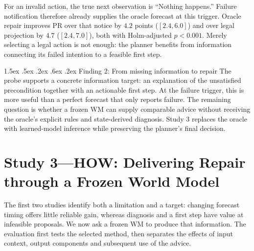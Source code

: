 \documentclass[runningheads]{llncs}
\makeatletter
\renewcommand\paragraph{\@startsection{paragraph}{4}{\z@}%
  {1.5ex \@plus .5ex \@minus .2ex}%
  {.6ex \@plus .2ex}%
  {\normalfont\normalsize\bfseries}}
\makeatother
\begin{document}
For an invalid action, the true next observation is ``Nothing happens.'' Failure notification therefore already supplies the oracle forecast at this trigger. Oracle repair improves PR over that notice by $4.2$ points ($[2.4,6.0]$) and over legal projection by $4.7$ ($[2.4,7.0]$), both with Holm-adjusted $p<0.001$. Merely selecting a legal action is not enough: the planner benefits from information connecting its failed intention to a feasible first step.

\paragraph{Finding 2: From missing information to repair}
The probe supports a concrete information target: an explanation of the unsatisfied precondition together with an actionable first step. At the failure trigger, this is more useful than a perfect forecast that only reports failure. The remaining question is whether a frozen WM can supply comparable advice without receiving the oracle's explicit rules and state-derived diagnosis. Study 3 replaces the oracle with learned-model inference while preserving the planner's final decision.

\section{Study 3---HOW: Delivering Repair through a Frozen World Model}\label{sec:how}\label{sec:method}
The first two studies identify both a limitation and a target: changing forecast timing offers little reliable gain, whereas diagnosis and a first step have value at infeasible proposals. We now ask a frozen WM to produce that information. The evaluation first tests the selected method, then separates the effects of input context, output components and subsequent use of the advice.
\end{document}
